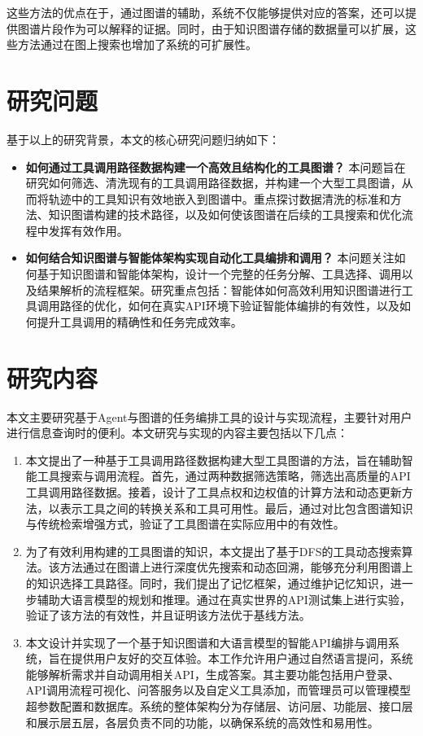 这些方法的优点在于，通过图谱的辅助，系统不仅能够提供对应的答案，还可以提供图谱片段作为可以解释的证据。同时，由于知识图谱存储的数据量可以扩展，这些方法通过在图上搜索也增加了系统的可扩展性。

\section{研究问题}

基于以上的研究背景，本文的核心研究问题归纳如下：
\begin{itemize}
    \item \textbf{如何通过工具调用路径数据构建一个高效且结构化的工具图谱？}
   本问题旨在研究如何筛选、清洗现有的工具调用路径数据，并构建一个大型工具图谱，从而将轨迹中的工具知识有效地嵌入到图谱中。重点探讨数据清洗的标准和方法、知识图谱构建的技术路径，以及如何使该图谱在后续的工具搜索和优化流程中发挥有效作用。
    \item \textbf{如何结合知识图谱与智能体架构实现自动化工具编排和调用？}
   本问题关注如何基于知识图谱和智能体架构，设计一个完整的任务分解、工具选择、调用以及结果解析的流程框架。研究重点包括：智能体如何高效利用知识图谱进行工具调用路径的优化，如何在真实API环境下验证智能体编排的有效性，以及如何提升工具调用的精确性和任务完成效率。
\end{itemize}

\section{研究内容}
本文主要研究基于Agent与图谱的任务编排工具的设计与实现流程，主要针对用户进行信息查询时的便利。本文研究与实现的内容主要包括以下几点：

\begin{enumerate}
    \item 本文提出了一种基于工具调用路径数据构建大型工具图谱的方法，旨在辅助智能工具搜索与调用流程。首先，通过两种数据筛选策略，筛选出高质量的API工具调用路径数据。接着，设计了工具点权和边权值的计算方法和动态更新方法，以表示工具之间的转换关系和工具可用性。最后，通过对比包含图谱知识与传统检索增强方式，验证了工具图谱在实际应用中的有效性。
    \item 为了有效利用构建的工具图谱的知识，本文提出了基于DFS的工具动态搜索算法。该方法通过在图谱上进行深度优先搜索和动态回溯，能够充分利用图谱上的知识选择工具路径。同时，我们提出了记忆框架，通过维护记忆知识，进一步辅助大语言模型的规划和推理。通过在真实世界的API测试集上进行实验，验证了该方法的有效性，并且证明该方法优于基线方法。
    \item 本文设计并实现了一个基于知识图谱和大语言模型的智能API编排与调用系统，旨在提供用户友好的交互体验。本工作允许用户通过自然语言提问，系统能够解析需求并自动调用相关API，生成答案。其主要功能包括用户登录、API调用流程可视化、问答服务以及自定义工具添加，而管理员可以管理模型超参数配置和数据库。系统的整体架构分为存储层、访问层、功能层、接口层和展示层五层，各层负责不同的功能，以确保系统的高效性和易用性。
\end{enumerate}

